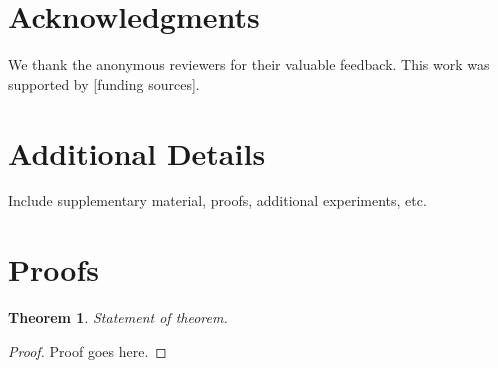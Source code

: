 \documentclass[10pt,a4paper,twocolumn]{article}
\newtheorem{theorem}{Theorem}
\begin{document}

\section*{Acknowledgments}

We thank the anonymous reviewers for their valuable feedback. This work was supported by [funding sources].






\appendix

\section{Additional Details}
\label{app:details}

Include supplementary material, proofs, additional experiments, etc.

\section{Proofs}
\label{app:proofs}

\begin{theorem}
    Statement of theorem.
\end{theorem}

\begin{proof}
    Proof goes here.
\end{proof}
\end{document}
